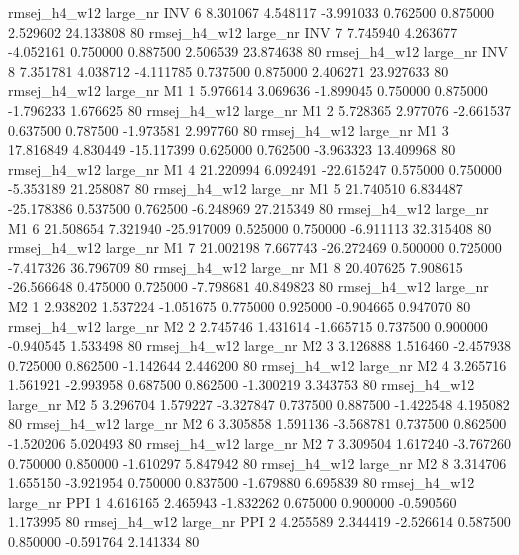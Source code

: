 rmsej_h4_w12   large_nr      INV                 6  8.301067  4.548117  -3.991033 0.762500 0.875000  2.529602   24.133808 80
rmsej_h4_w12   large_nr      INV                 7  7.745940  4.263677  -4.052161 0.750000 0.887500  2.506539   23.874638 80
rmsej_h4_w12   large_nr      INV                 8  7.351781  4.038712  -4.111785 0.737500 0.875000  2.406271   23.927633 80
rmsej_h4_w12   large_nr       M1                 1  5.976614  3.069636  -1.899045 0.750000 0.875000 -1.796233    1.676625 80
rmsej_h4_w12   large_nr       M1                 2  5.728365  2.977076  -2.661537 0.637500 0.787500 -1.973581    2.997760 80
rmsej_h4_w12   large_nr       M1                 3 17.816849  4.830449 -15.117399 0.625000 0.762500 -3.963323   13.409968 80
rmsej_h4_w12   large_nr       M1                 4 21.220994  6.092491 -22.615247 0.575000 0.750000 -5.353189   21.258087 80
rmsej_h4_w12   large_nr       M1                 5 21.740510  6.834487 -25.178386 0.537500 0.762500 -6.248969   27.215349 80
rmsej_h4_w12   large_nr       M1                 6 21.508654  7.321940 -25.917009 0.525000 0.750000 -6.911113   32.315408 80
rmsej_h4_w12   large_nr       M1                 7 21.002198  7.667743 -26.272469 0.500000 0.725000 -7.417326   36.796709 80
rmsej_h4_w12   large_nr       M1                 8 20.407625  7.908615 -26.566648 0.475000 0.725000 -7.798681   40.849823 80
rmsej_h4_w12   large_nr       M2                 1  2.938202  1.537224  -1.051675 0.775000 0.925000 -0.904665    0.947070 80
rmsej_h4_w12   large_nr       M2                 2  2.745746  1.431614  -1.665715 0.737500 0.900000 -0.940545    1.533498 80
rmsej_h4_w12   large_nr       M2                 3  3.126888  1.516460  -2.457938 0.725000 0.862500 -1.142644    2.446200 80
rmsej_h4_w12   large_nr       M2                 4  3.265716  1.561921  -2.993958 0.687500 0.862500 -1.300219    3.343753 80
rmsej_h4_w12   large_nr       M2                 5  3.296704  1.579227  -3.327847 0.737500 0.887500 -1.422548    4.195082 80
rmsej_h4_w12   large_nr       M2                 6  3.305858  1.591136  -3.568781 0.737500 0.862500 -1.520206    5.020493 80
rmsej_h4_w12   large_nr       M2                 7  3.309504  1.617240  -3.767260 0.750000 0.850000 -1.610297    5.847942 80
rmsej_h4_w12   large_nr       M2                 8  3.314706  1.655150  -3.921954 0.750000 0.837500 -1.679880    6.695839 80
rmsej_h4_w12   large_nr      PPI                 1  4.616165  2.465943  -1.832262 0.675000 0.900000 -0.590560    1.173995 80
rmsej_h4_w12   large_nr      PPI                 2  4.255589  2.344419  -2.526614 0.587500 0.850000 -0.591764    2.141334 80
